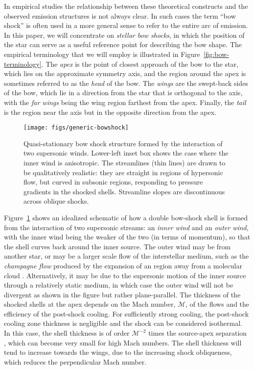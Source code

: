 \documentclass[useAMS, usenatbib, a4paper]{mnras}
\newcommand\hii{\ion{H}{ii}}
\begin{document}
In empirical studies the relationship between these theoretical
constructs and the observed emission structures is not always clear.
In such cases the term ``bow shock'' is often used in a more general
sense to refer to the entire arc of emission.  In this paper, we will
concentrate on \textit{stellar bow shocks}, in which the position of
the star can serve as a useful reference point for describing the bow
shape.  The empirical terminology that we will employ is illustrated
in Figure~\ref{fig:bow-terminology}.  The \textit{apex} is the point
of closest approach of the bow to the star, which lies on the
approximate symmetry axis, and the region around the apex is sometimes
referred to as the \textit{head} of the bow.  The \textit{wings} are
the swept-back sides of the bow, which lie in a direction from the
star that is orthogonal to the axis, with the \textit{far wings} being
the wing region farthest from the apex. Finally, the \textit{tail} is
the region near the axis but in the opposite direction from the apex.

\begin{figure}
  \texttt{[image: figs/generic-bowshock]}
  \caption{Quasi-stationary bow shock structure formed by the
    interaction of two supersonic winds.  Lower-left inset box shows
    the case where the inner wind is anisotropic. The streamlines
    (thin lines) are drawn to be qualitatively realistic: they are
    straight in regions of hypersonic flow, but curved in subsonic
    regions, responding to pressure gradients in the shocked
    shells. Streamline slopes are discontinuous across oblique
    shocks.}
\label{fig:2-winds}
\end{figure}
\newcommand\Mach{\ensuremath{\mathcal{M}}} Figure~\ref{fig:2-winds}
shows an idealized schematic of how a double bow-shock shell is formed
from the interaction of two supersonic streams: an \textit{inner wind}
and an \textit{outer wind}, with the inner wind being the weaker of
the two (in terms of momentum), so that the shell curves back around
the inner source.  The outer wind may be from another star, or may be
a larger scale flow of the interstellar medium, such as the
\textit{champagne flow} produced by the expansion of an \hii{} region
away from a molecular cloud \citep{Tenorio-Tagle:1979a, Shu:2002a,
  Medina:2014a}.  Alternatively, it may be due to the supersonic
motion of the inner source through a relatively static medium, in
which case the outer wind will not be divergent as shown in the figure
but rather plane-parallel.  The thickness of the shocked shells at the
apex depends on the Mach number, \Mach{}, of the flows and the
efficiency of the post-shock cooling.  For sufficiently strong
cooling, the post-shock cooling zone thickness is negligible and the
shock can be considered isothermal.  In this case, the shell thickness
is of order \(\Mach^{-2}\) times the source-apex separation
\citep{Henney:2002a}, which can become very small for high Mach
numbers.  The shell thickness will tend to increase towards the wings,
due to the increasing shock obliqueness, which reduces the
perpendicular Mach number.
\end{document}

